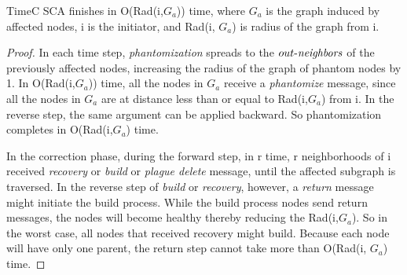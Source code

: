 \begin{replemma}{TimeC}
SCA finishes in O(Rad(i,$G_{a}$)) time, where $G_{a}$ is the graph
induced by affected nodes, i is the initiator, and Rad(i, $G_{a}$) is radius
of the graph from i.
\end{replemma}
\begin{proof}
In each time step, \emph{phantomization} spreads to the $\mathop{\mbox{$out$-$\mathit{neighbors}$}}$ of the previously
affected nodes, increasing the radius of the graph of phantom nodes by 1.
In O(Rad(i,$G_{a}$)) time, all the nodes in $G_{a}$ receive
a \emph{phantomize} message, since all the nodes in $G_{a}$ are at distance less than
or equal to Rad(i,$G_{a}$) from i. In the reverse step, the same argument can be
applied backward.
So phantomization completes in O(Rad(i,$G_{a}$) time.

In the correction phase, during the forward step, in r time, r neighborhoods of i
received \emph{recovery} or \emph{build} or \emph{plague delete} message, until
the affected subgraph is traversed.
In the reverse step of \emph{build} or \emph{recovery}, however,
a \emph{return} message might initiate the build process.
While the build process nodes send return messages, the nodes
will become healthy thereby reducing the Rad(i,$G_{a}$).
So in the worst case, all nodes that received recovery might build. Because
each node will have only one parent, the return
step cannot take more than O(Rad(i, $G_{a}$) time.
\end{proof}

